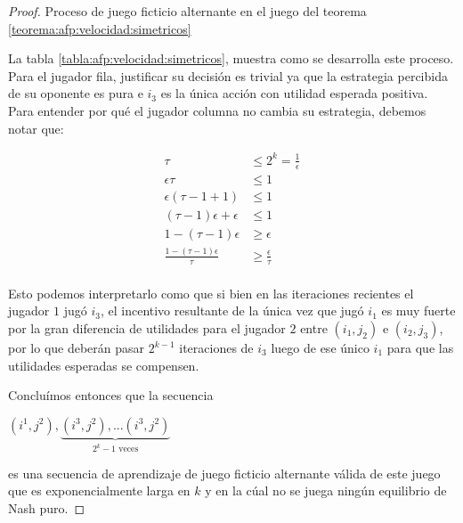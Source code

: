 \begin{proof}
    \begin{table}
        
        \caption{Proceso de juego ficticio alternante en el juego del teorema \ref{teorema:afp:velocidad:simetricos}}
        \label{tabla:afp:velocidad:simetricos}
    \end{table}

    La tabla \ref{tabla:afp:velocidad:simetricos}, muestra como se desarrolla este proceso. Para el jugador fila, justificar su decisión es trivial ya que la estrategia percibida de su oponente es pura e $i_3$ es la única acción con utilidad esperada positiva. Para entender por qué el jugador columna no cambia su estrategia, debemos notar que:

    \begin{align*}
        \tau &\le 2^k = \frac{1}{\epsilon} \\
        \epsilon \tau&\le 1 \\
        \epsilon (\tau - 1 + 1) &\le 1\\
        (\tau - 1) \epsilon + \epsilon &\le 1\\
        1-(\tau-1)\epsilon &\ge \epsilon \\
        \frac{1-(\tau-1)\epsilon}{\tau} &\ge \frac{\epsilon}{\tau} \\
    \end{align*}

    Esto podemos interpretarlo como que si bien en las iteraciones recientes el jugador $1$ jugó $i_3$, el incentivo resultante de la única vez que jugó $i_1$ es muy fuerte por la gran diferencia de utilidades para el jugador $2$ entre $(i_1, j_2)$ e $(i_2, j_3)$, por lo que deberán pasar $2^{k-1}$ iteraciones de $i_3$ luego de ese único $i_1$ para que las utilidades esperadas se compensen.

    Concluímos entonces que la secuencia

    \begin{center}
    \begin{math}
        (i^1, j^2), \underbrace{(i^3, j^2), ... (i^3, j^2)}_{\text{$2^k - 1$ veces}}
    \end{math}
    \end{center}

    es una secuencia de aprendizaje de juego ficticio alternante válida de este juego que es exponencialmente larga en $k$ y en la cúal no se juega ningún equilibrio de Nash puro.

\end{proof}


